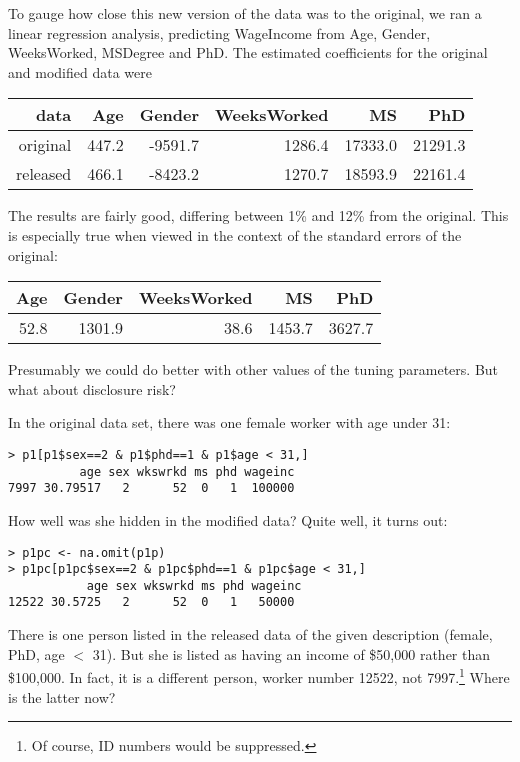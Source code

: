 \documentclass[11pt]{article}
\begin{document}
To gauge how close this new version of the data was to the original, we
ran a linear regression analysis, predicting WageIncome from Age,
Gender, WeeksWorked, MSDegree and PhD.  The estimated coefficients for
the original and modified data were

\begin{tabular}{|r|r|r|r|r|r|}
\hline
data & Age & Gender & WeeksWorked & MS & PhD \\ \hline 
original & 447.2 & -9591.7 & 1286.4 & 17333.0 & 21291.3 \\ \hline 
released & 466.1 & -8423.2 & 1270.7 & 18593.9 & 22161.4 \\ \hline 
\end{tabular}

The results are fairly good, differing between 1\% and 12\% from the
original.  This is especially true when viewed in the context of the
standard errors of the original:

\begin{tabular}{|r|r|r|r|r|}
\hline
Age & Gender & WeeksWorked & MS & PhD \\ \hline 
52.8 & 1301.9 & 38.6 & 1453.7 & 3627.7 \\ \hline
\end{tabular}

Presumably we could do better with other values of the tuning
parameters.  But what about disclosure risk?

In the original data set, there was one female worker with age under 31:

\begin{lstlisting}
> p1[p1$sex==2 & p1$phd==1 & p1$age < 31,]
          age sex wkswrkd ms phd wageinc
7997 30.79517   2      52  0   1  100000
\end{lstlisting}

How well was she hidden in the modified data?  Quite well, it turns out:

\begin{lstlisting}
> p1pc <- na.omit(p1p)
> p1pc[p1pc$sex==2 & p1pc$phd==1 & p1pc$age < 31,]
           age sex wkswrkd ms phd wageinc
12522 30.5725   2      52  0   1   50000 
\end{lstlisting}

There is one person listed in the released data of the given description
(female, PhD, age $<$ 31).  But she is listed as having an income of
\$50,000 rather than \$100,000.  In fact, it is a different person, worker
number 12522, not 7997.\footnote{Of course, ID numbers would be suppressed.}
Where is the latter now?
\end{document}
